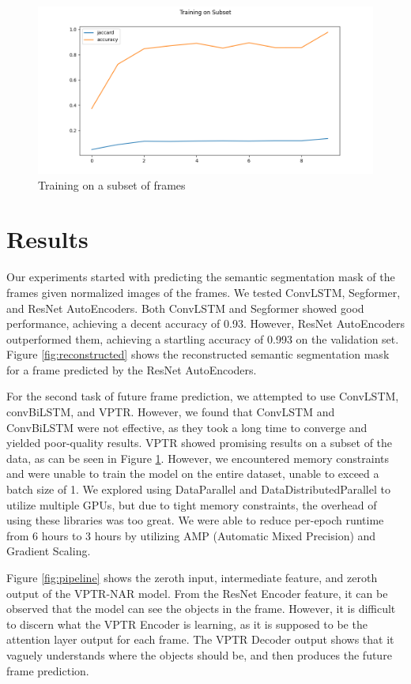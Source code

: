 \documentclass{article}
\begin{document}
\begin{figure}
  \centering
  \includegraphics[scale=0.3]{subset.png}
  \caption{Training on a subset of frames}
  \label{fig:subset}
\end{figure}


\section{Results}
Our experiments started with predicting the semantic segmentation mask of the frames given
normalized images of the frames. We tested ConvLSTM, Segformer, and ResNet AutoEncoders. Both
ConvLSTM and Segformer showed good performance, achieving a decent accuracy of 0.93. However,
ResNet AutoEncoders outperformed them, achieving a startling accuracy of 0.993 on the validation
set. Figure \ref{fig:reconstructed} shows the reconstructed semantic segmentation mask for a
frame predicted by the ResNet AutoEncoders.

For the second task of future frame prediction, we attempted to use ConvLSTM, convBiLSTM, and
VPTR. However, we found that ConvLSTM and ConvBiLSTM were not effective, as they took a long time
to converge and yielded poor-quality results. VPTR showed promising results on a subset of the
data, as can be seen in Figure \ref{fig:subset}. However, we encountered memory constraints and
were unable to train the model on the entire dataset, unable to exceed a batch size of 1. We
explored using DataParallel and DataDistributedParallel to utilize multiple GPUs, but due to
tight memory constraints, the overhead of using these libraries was too great. We were able to
reduce per-epoch runtime from 6 hours to 3 hours by utilizing AMP (Automatic Mixed Precision)
and Gradient Scaling.

Figure \ref{fig:pipeline} shows the zeroth input, intermediate feature, and zeroth output of the
VPTR-NAR model. From the ResNet Encoder feature, it can be observed that the model can see
the objects in the frame. However, it is difficult to discern what the VPTR Encoder is learning,
as it is supposed to be the attention layer output for each frame. The VPTR Decoder output shows
that it vaguely understands where the objects should be, and then produces the future frame
prediction.
\end{document}
